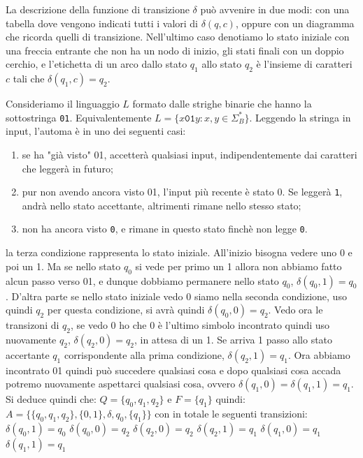 La descrizione della funzione di transizione $\delta$ può avvenire in due modi: con una tabella dove vengono indicati
tutti i valori di $\delta(q,c)$, oppure con un diagramma che ricorda quelli di transizione.
Nell'ultimo caso denotiamo lo stato iniziale con una freccia entrante che non ha un nodo di inizio, gli stati finali con
un doppio cerchio, e l'etichetta di un arco dallo stato $q_1$ allo stato $q_2$ è l'insieme di caratteri $c$ tali che
$\delta(q_1, c) = q_2 $.
\begin{example}
Consideriamo il linguaggio $L$ formato dalle strighe binarie che hanno la sottostringa \texttt{01}.
Equivalentemente $L=\{ x\mathtt{01}y: x,y \in \Sigma_{B}^{*}\}$.
Leggendo la stringa in input, l'automa è in uno dei seguenti casi:
	\begin{enumerate}
		\item se ha "già visto" 01, accetterà qualsiasi input, indipendentemente dai caratteri che leggerà in futuro;
		\item pur non avendo ancora visto 01, l'input più recente è stato 0.
Se leggerà \texttt{1}, andrà nello stato accettante, altrimenti rimane nello stesso stato;
		\item non ha ancora visto \texttt{0}, e rimane in questo stato finchè non legge \texttt{0}.
	\end{enumerate}
	la terza condizione rappresenta lo stato iniziale. All'inizio bisogna vedere uno 0 e poi un 1. Ma se nello stato $q_0$ si vede per primo un 1 allora non abbiamo fatto alcun passo verso 01, e dunque dobbiamo permanere nello stato $q_0$, $\delta(q_0,1)=q_0$. D'altra parte se nello stato iniziale vedo 0 siamo nella seconda condizione, uso quindi $q_2$ per questa condizione, si avrà quindi $\delta(q_0,0)=q_2$. Vedo ora le transizoni di $q_2$, se vedo 0 ho che 0 è l'ultimo simbolo incontrato quindi uso nuovamente $q_2$, $\delta(q_2,0)=q_2$, in attesa di un 1. Se arriva 1 passo allo stato accertante $q_1$ corrispondente alla prima condizione, $\delta(q_2,1)=q_1$. Ora abbiamo incontrato 01 quindi può succedere qualsiasi cosa e dopo qualsiasi cosa accada potremo nuovamente aspettarci qualsiasi cosa, ovvero $\delta(q_1,0)=\delta(q_1,1)=q_1$. Si deduce quindi che:
	$Q=\{q_0,q_1,q_2\} \text{ e } F=\{q_1\}$
	quindi:
	$A=\{\{q_0,q_1,q_2\} ,\{0,1\}, \delta, q_0, \{q_1\} \}$
	con in totale le seguenti transizioni:
	$\delta(q_0,1)=q_0$
	$\delta(q_0,0)=q_2$
	$\delta(q_2,0)=q_2$
	$\delta(q_2,1)=q_1$
	$\delta(q_1,0)=q_1$
	$\delta(q_1,1)=q_1$
\end{example}


